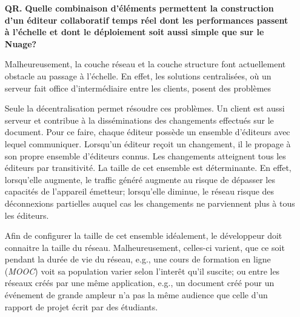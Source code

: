 \begin{itemize}
\item [\textbf{QR.}] \textbf{Quelle combinaison d'éléments permettent la
    construction d'un éditeur collaboratif temps réel dont les performances
    passent à l'échelle et dont le déploiement soit aussi simple que sur le
    Nuage?}
  
  Malheureusement, la couche réseau et la couche structure font actuellement
  obstacle au passage à l'échelle. En effet, les solutions centralisées, où un
  serveur fait office d'intermédiaire entre les clients, posent des problèmes
  Seule la décentralisation permet résoudre ces problèmes. Un client est aussi
  serveur et contribue à la disséminations des changements effectués sur le
  document. Pour ce faire, chaque éditeur possède un ensemble d'éditeurs avec
  lequel communiquer. Lorsqu'un éditeur reçoit un changement, il le propage à
  son propre ensemble d'éditeurs connus. Les changements atteignent tous les
  éditeurs par transitivité. La taille de cet ensemble est déterminante. En
  effet, lorsqu'elle augmente, le traffic généré augmente au risque de dépasser
  les capacités de l'appareil émetteur; lorsqu'elle diminue, le réseau risque
  des déconnexions partielles auquel cas les changements ne parviennent plus à
  tous les éditeurs.

  Afin de configurer la taille de cet ensemble idéalement, le développeur doit
  connaitre la taille du réseau. Malheureusement, celles-ci varient, que ce soit
  pendant la durée de vie du réseau, e.g., une cours de formation en ligne
  (\emph{MOOC}) voit sa population varier selon l'interêt qu'il suscite; ou
  entre les réseaux créés par une même application, e.g., un document créé pour
  un événement de grande ampleur n'a pas la même audience que celle d'un rapport
  de projet écrit par des étudiants.



\end{itemize}
